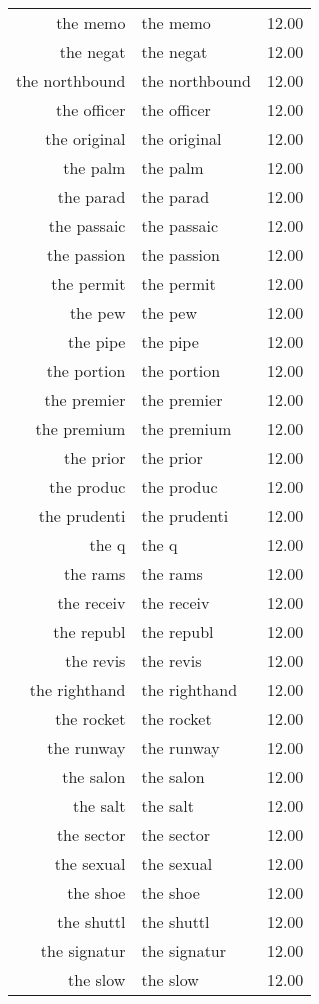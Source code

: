 \begin{table}[ht]
\begin{tabular}{rlr}
  the memo & the memo & 12.00 \\ 
  the negat & the negat & 12.00 \\ 
  the northbound & the northbound & 12.00 \\ 
  the officer & the officer & 12.00 \\ 
  the original & the original & 12.00 \\ 
  the palm & the palm & 12.00 \\ 
  the parad & the parad & 12.00 \\ 
  the passaic & the passaic & 12.00 \\ 
  the passion & the passion & 12.00 \\ 
  the permit & the permit & 12.00 \\ 
  the pew & the pew & 12.00 \\ 
  the pipe & the pipe & 12.00 \\ 
  the portion & the portion & 12.00 \\ 
  the premier & the premier & 12.00 \\ 
  the premium & the premium & 12.00 \\ 
  the prior & the prior & 12.00 \\ 
  the produc & the produc & 12.00 \\ 
  the prudenti & the prudenti & 12.00 \\ 
  the q & the q & 12.00 \\ 
  the rams & the rams & 12.00 \\ 
  the receiv & the receiv & 12.00 \\ 
  the republ & the republ & 12.00 \\ 
  the revis & the revis & 12.00 \\ 
  the righthand & the righthand & 12.00 \\ 
  the rocket & the rocket & 12.00 \\ 
  the runway & the runway & 12.00 \\ 
  the salon & the salon & 12.00 \\ 
  the salt & the salt & 12.00 \\ 
  the sector & the sector & 12.00 \\ 
  the sexual & the sexual & 12.00 \\ 
  the shoe & the shoe & 12.00 \\ 
  the shuttl & the shuttl & 12.00 \\ 
  the signatur & the signatur & 12.00 \\ 
  the slow & the slow & 12.00 \\ 

\end{tabular}
\end{table}
